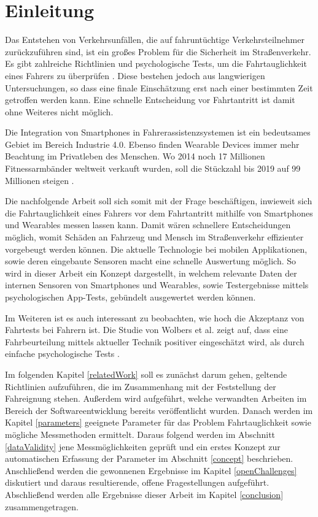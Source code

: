 \section{Einleitung}
\label{introduction}

Das Entstehen von Verkehrsunfällen, die auf fahruntüchtige Verkehrsteilnehmer zurückzuführen sind, ist ein großes Problem für die Sicherheit im Straßenverkehr. Es gibt zahlreiche Richtlinien und psychologische Tests, um die Fahrtauglichkeit eines Fahrers zu überprüfen \cite{drivervehiclelicencingagency,testverfahrenpsychometrischefahreignung,begutachtungsrichtlinien,beurteilungskriterien}. Diese bestehen jedoch aus langwierigen Untersuchungen, so dass eine finale Einschätzung erst nach einer bestimmten Zeit getroffen werden kann.  Eine schnelle Entscheidung vor Fahrtantritt ist damit ohne Weiteres nicht möglich.

Die Integration von Smartphones in Fahrerassistenzsystemen ist ein bedeutsames Gebiet im Bereich Industrie 4.0. Ebenso finden Wearable Devices immer mehr Beachtung im Privatleben des Menschen. Wo 2014 noch 17 Millionen Fitnessarmbänder weltweit verkauft wurden, soll die Stückzahl bis 2019 auf 99 Millionen steigen \cite{wearabletracking}. 

Die nachfolgende Arbeit soll sich somit mit der Frage beschäftigen, inwieweit sich die Fahrtauglichkeit eines Fahrers vor dem Fahrtantritt mithilfe von Smartphones und Wearables messen lassen kann. Damit wären schnellere Entscheidungen möglich, womit Schäden an Fahrzeug und Mensch im Straßenverkehr effizienter vorgebeugt werden können. Die aktuelle Technologie bei mobilen Applikationen, sowie deren eingebaute Sensoren macht eine schnelle Auswertung möglich. So wird in dieser Arbeit ein Konzept dargestellt, in welchem relevante Daten der internen Sensoren von Smartphones und Wearables, sowie Testergebnisse mittels psychologischen App-Tests, gebündelt ausgewertet werden können. 

Im Weiteren ist es auch interessant zu beobachten, wie hoch die Akzeptanz von Fahrtests bei Fahrern ist. Die Studie von Wolbers et al. zeigt auf, dass eine Fahrbeurteilung mittels aktueller Technik positiver eingeschätzt wird, als durch einfache psychologische Tests \cite{interaktivefahrsimulation}.

Im folgenden Kapitel \ref{relatedWork} soll es zunächst darum gehen, geltende Richtlinien aufzuführen, die im Zusammenhang mit der Feststellung der Fahreignung stehen. Außerdem wird aufgeführt, welche verwandten Arbeiten im Bereich der Softwareentwicklung bereits veröffentlicht wurden. Danach werden im Kapitel \ref{parameters} geeignete Parameter für das Problem Fahrtauglichkeit sowie mögliche Messmethoden ermittelt. Daraus folgend werden im Abschnitt \ref{dataValidity} jene Messmöglichkeiten  geprüft und ein erstes Konzept zur automatischen Erfassung der Parameter im Abschnitt \ref{concept} beschrieben. Anschließend werden die gewonnenen Ergebnisse im Kapitel \ref{openChallenges} diskutiert und daraus resultierende, offene Fragestellungen aufgeführt. Abschließend werden alle Ergebnisse dieser Arbeit im Kapitel \ref{conclusion} zusammengetragen.